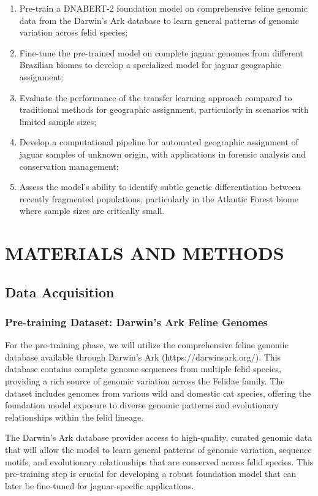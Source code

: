 \begin{enumerate}
	\item Pre-train a DNABERT-2 foundation model on comprehensive feline genomic data from the Darwin's Ark database to learn general patterns of genomic variation across felid species;
	\item Fine-tune the pre-trained model on complete jaguar genomes from different Brazilian biomes to develop a specialized model for jaguar geographic assignment;
	\item Evaluate the performance of the transfer learning approach compared to traditional methods for geographic assignment, particularly in scenarios with limited sample sizes;
	\item Develop a computational pipeline for automated geographic assignment of jaguar samples of unknown origin, with applications in forensic analysis and conservation management;
	\item Assess the model's ability to identify subtle genetic differentiation between recently fragmented populations, particularly in the Atlantic Forest biome where sample sizes are critically small.
\end{enumerate}

\section{MATERIALS AND METHODS}

\subsection{Data Acquisition}

\subsubsection{Pre-training Dataset: Darwin's Ark Feline Genomes}

For the pre-training phase, we will utilize the comprehensive feline genomic database available through Darwin's Ark (https://darwinsark.org/). This database contains complete genome sequences from multiple felid species, providing a rich source of genomic variation across the Felidae family. The dataset includes genomes from various wild and domestic cat species, offering the foundation model exposure to diverse genomic patterns and evolutionary relationships within the felid lineage.

The Darwin's Ark database provides access to high-quality, curated genomic data that will allow the model to learn general patterns of genomic variation, sequence motifs, and evolutionary relationships that are conserved across felid species. This pre-training step is crucial for developing a robust foundation model that can later be fine-tuned for jaguar-specific applications.

